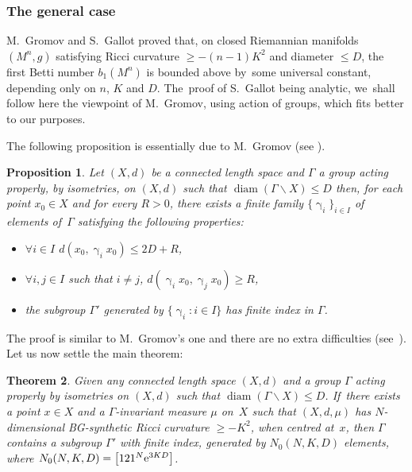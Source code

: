 \documentclass[10pt,a4paper]{amsart}
\numberwithin{equation}{section}
\newtheorem{theor}{Theorem}[section]
\newtheorem{prop}[theor]{Proposition}
\newcommand{\diam}{\operatorname{diam}}
\newcommand{\g}{\operatorname{\gamma}}
\begin{document}
\subsubsection{The general case}
M.~Gromov and S.~Gallot proved that, on closed Riemannian manifolds $(M^n, g)$ satisfying Ricci curvature $\ge - (n-1) K^2$ and diameter $\le D$,
the first Betti number $b_1 (M^n)$ is bounded above by~some universal constant, depending only on $n$, $K$ and $D$. The~proof of S.~Gallot being analytic, we~shall follow here the viewpoint
of M.~Gromov, using action of groups, which fits better to our purposes.

The following proposition is essentially due to M.~Gromov (see \cite[Lemma~5.19]{Gr1}).

\begin{prop}\label{gromovarg}
Let $(X,d)$ be a connected length space and $\Gamma$ a group acting properly, by isometries, on $(X,d)$ such that $\diam (\Gamma \backslash X) \le
D$ then, for
each point $x_0 \in X$ and for every $R> 0$, there exists a finite family
$\{\g_i\}_{i \in I}$ of elements of~$\Gamma$ satisfying the following properties:
\begin{itemize}\itemsep=0pt

\item[$(i)$] $ \forall i \in I$ $d(x_0, \g_i x_0) \le 2 D + R$,

\item[$(ii)$] $ \forall i, j \in I$ such that $i\ne j$, $d(\g_i x_0, \g_j x_0) \ge R$,

\item[$(iii)$] the subgroup $\Gamma'$ generated by $\{\g_i\colon i \in I\}$ has
finite index in $\Gamma$.

\end{itemize}
\end {prop}

The proof is similar to M.~Gromov's one and there are no extra difficulties (see~\cite[proof of~Lemma~5.19]{Gr1}).
Let us now settle the main theorem:

\begin{theor}\label{finitelygenerated}
Given any connected length space $(X, d)$ and a group $\Gamma$ acting properly by isometries on $(X, d)$ such that $\diam ( \Gamma \backslash X)\le D$. If~there exists a point $x \in X$ and a $\Gamma$-invariant measure $\mu$ on~$X$ such that $(X,d,\mu)$ has $N$-dimensional BG-synthetic Ricci curvature
$\ge -K^2$, when centred at~$x$, then $\Gamma$ contains a subgroup $\Gamma'$ with finite index, generated by $ N_0 (N, K, D)$ elements, where
$N_0 (N, K, D) = \big[121^N {\rm e}^{3 K D}\big]$.
\end{theor}
\end{document}
